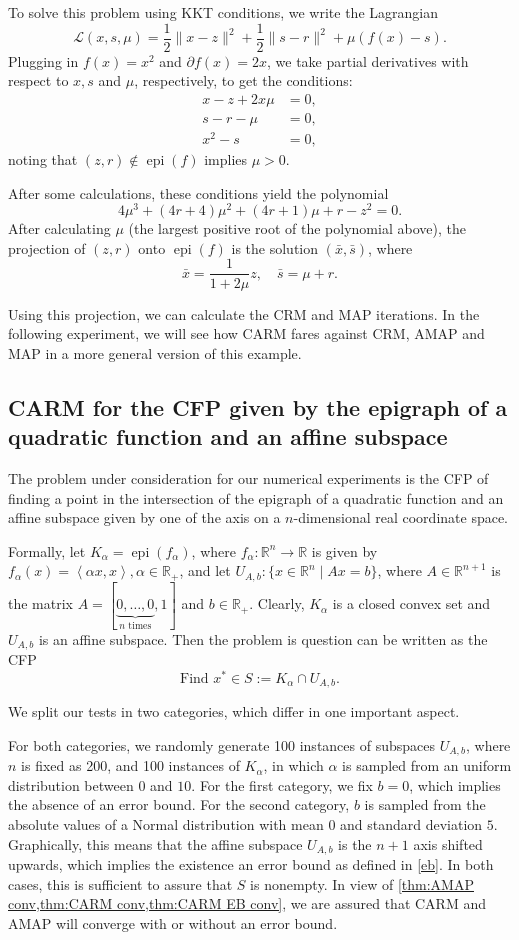 \documentclass[smallextended,numbook,nospthms]{svjour3}
\theoremstyle{plain}
\theoremstyle{definition}
\def\RR{\mathds R}
\DeclareMathOperator{\epi}{epi}
\newcommand{\scal}[2]{\left\langle{#1},{#2}  \right\rangle}
\begin{document}
To solve this problem using KKT conditions, we write the Lagrangian
\[
\mathcal{L}(x,s,\mu)=\frac{1}{2} \|x-z\|^2 + \frac{1}{2} \|s-r\|^2 + \mu(f(x)-s).
\]
Plugging in $f(x)=x^2$ and $\partial f(x)=2x$, we take partial derivatives with respect to $x,s$ and $\mu$, respectively, to get the conditions:
\begin{align}
	x-z+2x\mu&=0, \\
	s-r-\mu&=0, \\
	x^2-s&=0,
\end{align}
noting that $(z,r) \notin \epi(f)$ implies $\mu>0$.

After some calculations, these conditions yield the polynomial
\[
4 \mu^3 + (4r+4)\mu^2 + (4r+1)\mu + r-z^2=0.
\]
After calculating $\mu$ (the largest positive root of the polynomial above), the projection of $(z,r)$ onto $\epi(f)$ is the solution $(\bar{x},\bar{s})$, where
\[
\bar{x}=\frac{1}{1+2\mu}z, \quad \bar{s}=\mu + r.
\]

Using this projection, we can calculate the CRM and MAP iterations. In the following experiment, we will see how CARM fares against CRM, AMAP and MAP in a more general version of this example.

\subsection{CARM for the CFP given by the epigraph of a quadratic function and an affine subspace}

The problem under consideration for our numerical experiments is the CFP of finding a point in the intersection of the epigraph of a quadratic function and an affine subspace given by one of the axis on a $n$-dimensional real coordinate space.

Formally, let $K_{\alpha}=\epi(f_{\alpha})$, where $f_{\alpha}:\RR^{n} \rightarrow \RR$ is given by $f_{\alpha}(x)=\scal{\alpha x}{x}, \alpha \in \RR_{+}$, and let $U_{A,b}: \{x \in \RR^n \mid Ax=b\}$, where $A \in \RR^{n+1}$ is the matrix $A=[\underbrace{0, \ldots, 0}_{n \text{ times}},1]$ and $b \in \RR_{+}$. Clearly, $K_{\alpha}$ is a closed convex set and $U_{A, b}$ is an affine subspace. Then the problem is question can be written as the CFP
\[
\text{Find } x^{*} \in S:=K_{\alpha} \cap U_{A,b}.
\]

We split our tests in two categories, which differ in one important aspect.

For both categories, we randomly generate 100 instances of subspaces $U_{A, b}$, where $n$ is fixed as 200, and 100 instances of $K_{\alpha}$, in which $\alpha$ is sampled from an uniform distribution between $0$ and $10$. For the first category, we fix $b=0$, which implies the absence of an error bound. For the second category, $b$ is sampled from the absolute values of a Normal distribution with mean $0$ and standard deviation $5$. Graphically, this means that the affine subspace $U_{A,b}$ is the $n+1$ axis shifted upwards, which implies the existence an error bound as defined in \cref{eb}. In both cases, this is sufficient to assure that $S$ is nonempty. In view of \cref{thm:AMAP conv,thm:CARM conv,thm:CARM EB conv}, we are assured that CARM and AMAP will converge with or without an error bound.
\end{document}
